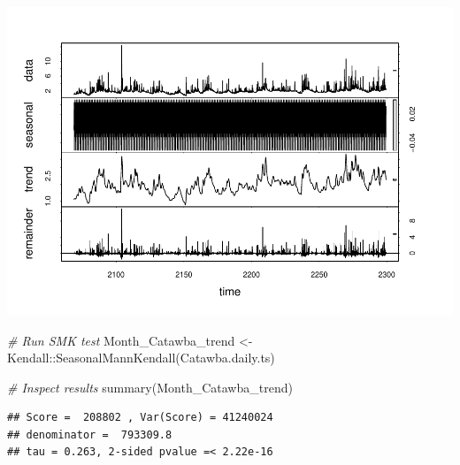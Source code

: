 \documentclass[
  12pt,
]{article}
\newenvironment{Shaded}{\begin{snugshade}}{\end{snugshade}}
\newcommand{\CommentTok}[1]{\textcolor[rgb]{0.56,0.35,0.01}{\textit{#1}}}
\newcommand{\FunctionTok}[1]{\textcolor[rgb]{0.00,0.00,0.00}{#1}}
\newcommand{\NormalTok}[1]{#1}
\newcommand{\OtherTok}[1]{\textcolor[rgb]{0.56,0.35,0.01}{#1}}
\newcommand{\SpecialCharTok}[1]{\textcolor[rgb]{0.00,0.00,0.00}{#1}}
\begin{document}
\includegraphics{Project_Template_files/figure-latex/TimeSeries-1.pdf}

\begin{Shaded}
\begin{Highlighting}[]
\CommentTok{\# Run SMK test}
\NormalTok{Month\_Catawba\_trend }\OtherTok{\textless{}{-}}\NormalTok{ Kendall}\SpecialCharTok{::}\FunctionTok{SeasonalMannKendall}\NormalTok{(Catawba.daily.ts)}

\CommentTok{\# Inspect results}
\FunctionTok{summary}\NormalTok{(Month\_Catawba\_trend)}
\end{Highlighting}
\end{Shaded}

\begin{verbatim}
## Score =  208802 , Var(Score) = 41240024
## denominator =  793309.8
## tau = 0.263, 2-sided pvalue =< 2.22e-16
\end{verbatim}
\end{document}
